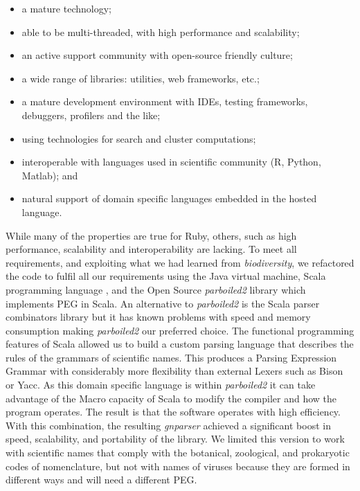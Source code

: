 \documentclass{bmcart}
\begin{document}
\begin{itemize}

    \item a mature technology;

    \item able to be multi-threaded, with high performance and scalability;

    \item an active support community with open-source friendly culture;

    \item a wide range of libraries: utilities, web frameworks, etc.;

    \item a mature development environment with IDEs, testing frameworks, debuggers,  profilers and the like;

    \item using technologies for search and cluster computations;

    \item interoperable with languages used in scientific community (R,
      Python, Matlab); and

    \item natural support of domain specific languages embedded in the hosted
      language.

\end{itemize}

While many of the properties are true for Ruby, others, such as high
performance, scalability and interoperability are lacking. To meet all
requirements, and exploiting what we had learned from \textit{biodiversity}, we
refactored the code to fulfil all our requirements using the Java virtual machine, Scala
programming language \cite{odersky2004overview}, and the Open Source
\textit{parboiled2} library \cite{parboiled2} which implements PEG in Scala. An
alternative to \textit{parboiled2} is the Scala parser combinators library
\cite{moors2008parser} but it has known problems with speed and memory consumption
making \textit{parboiled2} our preferred choice. The functional programming features of Scala allowed us to build a custom
parsing language that describes the rules of the grammars of scientific names.
This produces a Parsing Expression Grammar with considerably more
flexibility than external Lexers such as Bison or Yacc. As this domain specific
language is within \textit{parboiled2} it can take advantage of the Macro
capacity of Scala \cite{Burmako:2013:SML:2489837.2489840} to modify the
compiler and how the program operates. The result is that the software operates
with high efficiency. With this combination, the resulting \textit{gnparser} achieved a significant
boost in speed, scalability, and portability of the library.  We limited this
version to work with scientific names that comply with the botanical,
zoological, and prokaryotic codes of nomenclature, but not with names of viruses because they are
formed in different ways \cite{ICTV, Patterson:inpress-a} and will need a different PEG.
\end{document}

